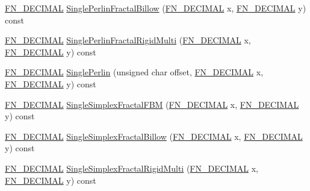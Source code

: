 \begin{DoxyCompactItemize}
\item 
\mbox{\hyperlink{_fast_noise_8h_a75a9ef6d2541c4921815b885bfd449c3}{F\+N\+\_\+\+D\+E\+C\+I\+M\+AL}} \mbox{\hyperlink{class_fast_noise_a7de7c8fe23437c93cc139193e48f3079}{Single\+Perlin\+Fractal\+Billow}} (\mbox{\hyperlink{_fast_noise_8h_a75a9ef6d2541c4921815b885bfd449c3}{F\+N\+\_\+\+D\+E\+C\+I\+M\+AL}} x, \mbox{\hyperlink{_fast_noise_8h_a75a9ef6d2541c4921815b885bfd449c3}{F\+N\+\_\+\+D\+E\+C\+I\+M\+AL}} y) const
\item 
\mbox{\hyperlink{_fast_noise_8h_a75a9ef6d2541c4921815b885bfd449c3}{F\+N\+\_\+\+D\+E\+C\+I\+M\+AL}} \mbox{\hyperlink{class_fast_noise_a20d9ce6e0bd7730ac242e7de5fda0541}{Single\+Perlin\+Fractal\+Rigid\+Multi}} (\mbox{\hyperlink{_fast_noise_8h_a75a9ef6d2541c4921815b885bfd449c3}{F\+N\+\_\+\+D\+E\+C\+I\+M\+AL}} x, \mbox{\hyperlink{_fast_noise_8h_a75a9ef6d2541c4921815b885bfd449c3}{F\+N\+\_\+\+D\+E\+C\+I\+M\+AL}} y) const
\item 
\mbox{\hyperlink{_fast_noise_8h_a75a9ef6d2541c4921815b885bfd449c3}{F\+N\+\_\+\+D\+E\+C\+I\+M\+AL}} \mbox{\hyperlink{class_fast_noise_a2dd412856eb0d588fe8fbcb529517455}{Single\+Perlin}} (unsigned char offset, \mbox{\hyperlink{_fast_noise_8h_a75a9ef6d2541c4921815b885bfd449c3}{F\+N\+\_\+\+D\+E\+C\+I\+M\+AL}} x, \mbox{\hyperlink{_fast_noise_8h_a75a9ef6d2541c4921815b885bfd449c3}{F\+N\+\_\+\+D\+E\+C\+I\+M\+AL}} y) const
\item 
\mbox{\hyperlink{_fast_noise_8h_a75a9ef6d2541c4921815b885bfd449c3}{F\+N\+\_\+\+D\+E\+C\+I\+M\+AL}} \mbox{\hyperlink{class_fast_noise_af7e3a4be65f1e27d1af76111a382adbc}{Single\+Simplex\+Fractal\+F\+BM}} (\mbox{\hyperlink{_fast_noise_8h_a75a9ef6d2541c4921815b885bfd449c3}{F\+N\+\_\+\+D\+E\+C\+I\+M\+AL}} x, \mbox{\hyperlink{_fast_noise_8h_a75a9ef6d2541c4921815b885bfd449c3}{F\+N\+\_\+\+D\+E\+C\+I\+M\+AL}} y) const
\item 
\mbox{\hyperlink{_fast_noise_8h_a75a9ef6d2541c4921815b885bfd449c3}{F\+N\+\_\+\+D\+E\+C\+I\+M\+AL}} \mbox{\hyperlink{class_fast_noise_aa23a186cee489865781430d344cad11d}{Single\+Simplex\+Fractal\+Billow}} (\mbox{\hyperlink{_fast_noise_8h_a75a9ef6d2541c4921815b885bfd449c3}{F\+N\+\_\+\+D\+E\+C\+I\+M\+AL}} x, \mbox{\hyperlink{_fast_noise_8h_a75a9ef6d2541c4921815b885bfd449c3}{F\+N\+\_\+\+D\+E\+C\+I\+M\+AL}} y) const
\item 
\mbox{\hyperlink{_fast_noise_8h_a75a9ef6d2541c4921815b885bfd449c3}{F\+N\+\_\+\+D\+E\+C\+I\+M\+AL}} \mbox{\hyperlink{class_fast_noise_a185d239a0bbbc93f673eeb1fe49eae80}{Single\+Simplex\+Fractal\+Rigid\+Multi}} (\mbox{\hyperlink{_fast_noise_8h_a75a9ef6d2541c4921815b885bfd449c3}{F\+N\+\_\+\+D\+E\+C\+I\+M\+AL}} x, \mbox{\hyperlink{_fast_noise_8h_a75a9ef6d2541c4921815b885bfd449c3}{F\+N\+\_\+\+D\+E\+C\+I\+M\+AL}} y) const

\end{DoxyCompactItemize}
